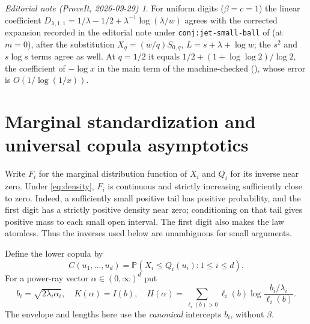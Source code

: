 \documentclass[11pt,a4paper]{article}
\theoremstyle{definition}
\theoremstyle{remark}
\newtheorem*{ednote}{Editorial note (ProveIt, 2026-09-29)}
\newcommand{\PP}{\mathbb P}
\numberwithin{equation}{section}
\begin{document}
\begin{ednote}
For uniform digits ($\beta=c=1$) the linear coefficient
$D_{\lambda,1,1}=1/\lambda-1/2+\lambda^{-1}\log(\lambda/w)$ agrees with
the corrected expansion recorded in the editorial note under
\texttt{conj:jet-small-ball} of \cite{RepoCommon} (at $m=0$), after the
substitution $X_q=(w/q)S_{0,q}$, $L=s+\lambda+\log w$; the $s^2$ and
$s\log s$ terms agree as well. At $q=1/2$ it equals
$1/2+(1+\log\log2)/\log2$, the coefficient of $-\log x$ in the main term
 of the machine-checked
(),
whose error is $O(1/\log(1/x))$.
\end{ednote}

\section{Marginal standardization and universal copula asymptotics}
\label{sec:copula}

Write $F_i$ for the marginal distribution function of $X_i$ and $Q_i$ for
its inverse near zero. Under \eqref{eq:density}, $F_i$ is continuous and
strictly increasing sufficiently close to zero. Indeed, a sufficiently
small positive tail has positive probability, and the first digit has a
strictly positive density near zero; conditioning on that tail gives
positive mass to each small open interval. The first digit also makes the
law atomless. Thus the inverses used below are unambiguous for small
arguments.

Define the lower copula by
\begin{equation}
 C(u_1,\ldots,u_d)=\PP(X_i\le Q_i(u_i):1\le i\le d).
 \label{eq:copula}
\end{equation}
For a power-ray vector $\alpha\in(0,\infty)^d$ put
\begin{equation}
 b_i=\sqrt{2\lambda_i\alpha_i},\quad
 K(\alpha)=I(b),\quad
 H(\alpha)=\sum_{\ell_i(b)>0}\ell_i(b)
     \log\frac{b_i/\lambda_i}{\ell_i(b)}.
 \label{eq:KH}
\end{equation}
The envelope and lengths here use the \emph{canonical} intercepts $b_i$,
without $\beta$.
\end{document}
